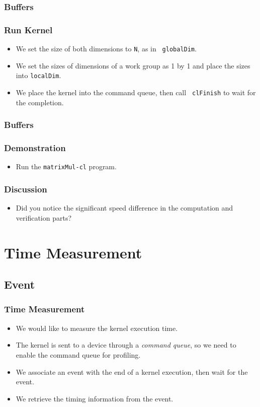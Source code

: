 \documentclass{beamer}
\begin{document}
\begin{frame}
  \frametitle{Buffers}
\end{frame}

\begin{frame}
  \frametitle{Run Kernel}
  \begin{itemize}
  \item We set the size of both dimensions to {\tt N}, as in {\tt
    globalDim}.
  \item We set the sizes of dimensions of a work group as 1 by 1 and
    place the sizes into {\tt localDim}.
  \item We place the kernel into the command queue, then call {\tt
    clFinish} to wait for the completion.
  \end{itemize}
\end{frame}

\begin{frame}
  \frametitle{Buffers}
\end{frame}



\begin{frame}
  \frametitle{Demonstration}
  \begin{itemize}
    \item Run the {\tt matrixMul-cl} program.
  \end{itemize}
\end{frame}

\begin{frame}
  \frametitle{Discussion}
  \begin{itemize}
  \item Did you notice the significant speed difference in the
    computation and verification parts?
  \end{itemize}
\end{frame}

\section{Time Measurement}

\subsection{Event}

\begin{frame}
  \frametitle{Time Measurement}
  \begin{itemize}
    \item We would like to measure the kernel execution time.
    \item The kernel is sent to a device through a {\em command
      queue}, so we need to enable the command queue for profiling.
    \item We associate an event with the end of a kernel execution,
      then wait for the event.
    \item We retrieve the timing information from the event.
  \end{itemize}
\end{frame}
\end{document}
